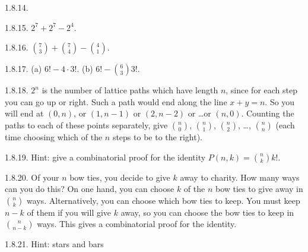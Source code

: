 \begin {itemize}
\begin{ans}{1.8.14.}
\end{ans}
\begin{ans}{1.8.15.}
		 $2^7 + 2^7 - 2^4$.
	
\end{ans}
\begin{ans}{1.8.16.}
		${7 \choose 3} + {7 \choose 4} - {4 \choose 1}$.
	
\end{ans}
\begin{ans}{1.8.17.}
		(a) $6! - 4\cdot 3!$.  (b) $6! - {6 \choose 3}3!$.
	
\end{ans}
\begin{ans}{1.8.18.}
		$2^n$ is the number of lattice paths which have length $n$, since for each step you can go up or right.  Such a path would end along the line $x + y = n$.  So you will end at $(0,n)$, or $(1,n-1)$ or $(2, n-2)$ or \ldots or $(n,0)$.  Counting the paths to each of these points separately, give ${n \choose 0}$, ${n \choose 1}$, ${n \choose 2}$, \ldots, ${n \choose n}$ (each time choosing which of the $n$ steps to be to the right).
	
\end{ans}
\begin{ans}{1.8.19.}
		Hint: give a combinatorial proof for the identity $P(n,k) = {n \choose k} k!$.
	
\end{ans}
\begin{ans}{1.8.20.}
		Of your $n$ bow ties, you decide to give $k$ away to charity.  How many ways can you do this?  On one hand, you can choose $k$ of the $n$ bow ties to give away in ${n \choose k}$ ways.  Alternatively, you can choose which bow ties to keep.  You must keep $n -k$ of them if you will give $k$ away, so you can choose the bow ties to keep in ${n \choose n-k}$ ways.  This gives a combinatorial proof for the identity.
	
\end{ans}
\begin{ans}{1.8.21.}
		Hint: stars and bars%
\end{ans}
\end{itemize}

